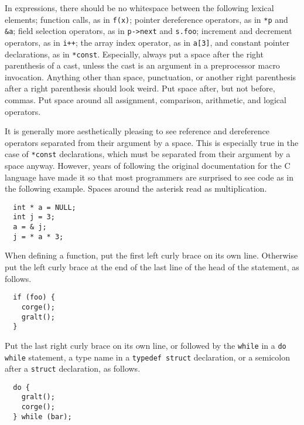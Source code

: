 \documentclass{lulu}
\newcommand{\code}[1]{\texttt{#1}\xspace}
\begin{document}
In expressions, there should be no whitespace between the following
lexical elements; function calls, as in \code{f(x)}; pointer
dereference operators, as in \code{*p} and \code{\&a}; field selection
operators, as in \code{p->next} and \code{s.foo}; increment and
decrement operators, as in \code{i++}; the array index operator, as in
\code{a[3]}, and constant pointer declarations, as in \code{*const}.
Especially, always put a space after the right parenthesis of a cast,
unless the cast is an argument in a preprocessor macro invocation.
Anything other than space, punctuation, or another right parenthesis
after a right parenthesis should look weird.  Put space after, but not
before, commas.  Put space around all assignment, comparison,
arithmetic, and logical operators.

It is generally more aesthetically pleasing to see reference and
dereference operators separated from their argument by a space.  This
is especially true in the case of \code{*const} declarations, which
must be separated from their argument by a space anyway.  However,
years of following the original documentation for the C language have
made it so that most programmers are surprised to see code as in the
following example.  Spaces around the asterisk read as multiplication.

\begin{samepage}
\begin{verbatim}
  int * a = NULL;
  int j = 3;
  a = & j;
  j = * a * 3;
\end{verbatim}
\end{samepage}

When defining a function, put the first left curly brace on its own
line.  Otherwise put the left curly brace at the end of the last line
of the head of the statement, as follows.

\begin{samepage}
\begin{verbatim}
  if (foo) {
    corge();
    gralt();
  }
\end{verbatim}
\end{samepage}

Put the last right curly brace on its own line, or followed by the
\code{while} in a \code{do while} statement, a type name in a
\code{typedef struct} declaration, or a semicolon after a
\code{struct} declaration, as follows.

\begin{samepage}
\begin{verbatim}
  do {
    gralt();
    corge();
  } while (bar);
\end{verbatim}
\end{samepage}
\end{document}
